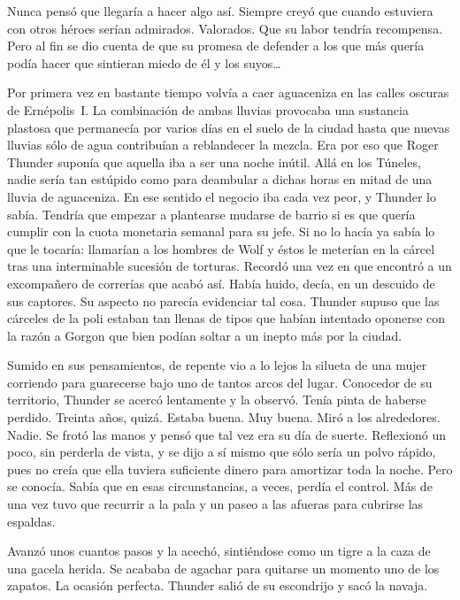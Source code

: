 Nunca pensó que llegaría a hacer algo así. Siempre creyó que cuando estuviera con otros héroes serían admirados. Valorados. Que su labor tendría recompensa. Pero al fin se dio cuenta de que su promesa de defender a los que más quería podía hacer que sintieran miedo de él y los suyos\dots

\fancyparbreak
Por primera vez en bastante tiempo volvía a caer aguaceniza en las calles oscuras de Ernépolis~I. La combinación de ambas lluvias provocaba una sustancia plastosa que permanecía por varios días en el suelo de la ciudad hasta que nuevas lluvias sólo de agua contribuían a reblandecer la mezcla. Era por eso que Roger Thunder suponía que aquella iba a ser una noche inútil. Allá en los Túneles, nadie sería tan estúpido como para deambular a dichas horas en mitad de una lluvia de aguaceniza. En ese sentido el negocio iba cada vez peor, y Thunder lo sabía. Tendría que empezar a plantearse mudarse de barrio si es que quería cumplir con la cuota monetaria semanal para su jefe. Si no lo hacía ya sabía lo que le tocaría: llamarían a los hombres de Wolf y éstos le meterían en la cárcel tras una interminable sucesión de torturas. Recordó una vez en que encontró a un excompañero de correrías que acabó así. Había huido, decía, en un descuido de sus captores. Su aspecto no parecía evidenciar tal cosa. Thunder supuso que las cárceles de la poli estaban tan llenas de tipos que habían intentado oponerse con la razón a Gorgon que bien podían soltar a un inepto más por la ciudad.

Sumido en sus pensamientos, de repente vio a lo lejos la silueta de una mujer corriendo para guarecerse bajo uno de tantos arcos del lugar. Conocedor de su territorio, Thunder se acercó lentamente y la observó. Tenía pinta de haberse perdido. Treinta años, quizá. Estaba buena. Muy buena. Miró a los alrededores. Nadie. Se frotó las manos y pensó que tal vez era su día de suerte. Reflexionó un poco, sin perderla de vista, y se dijo a sí mismo que sólo sería un polvo rápido, pues no creía que ella tuviera suficiente dinero para amortizar toda la noche. Pero se conocía. Sabía que en esas circunstancias, a veces, perdía el control. Más de una vez tuvo que recurrir a la pala y un paseo a las afueras para cubrirse las espaldas.

Avanzó unos cuantos pasos y la acechó, sintiéndose como un tigre a la caza de una gacela herida. Se acababa de agachar para quitarse un momento uno de los zapatos. La ocasión perfecta. Thunder salió de su escondrijo y sacó la navaja.

